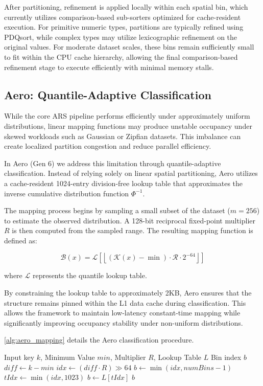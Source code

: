 After partitioning, refinement is applied locally within each spatial bin, which currently utilizes comparison-based sub-sorters optimized for cache-resident execution.
For primitive numeric types, partitions are typically refined using PDQsort, while complex types may utilize lexicographic refinement on the original values.
For moderate dataset scales, these bins remain sufficiently small to fit within the CPU cache hierarchy, allowing the final comparison-based refinement stage to execute efficiently with minimal memory stalls.

\subsection{Aero: Quantile-Adaptive Classification}
While the core ARS pipeline performs efficiently under approximately uniform distributions, linear mapping functions may produce unstable occupancy under skewed workloads such as Gaussian or Zipfian datasets.
This imbalance can create localized partition congestion and reduce parallel efficiency.

In Aero (Gen 6) we address this limitation through quantile-adaptive classification.
Instead of relying solely on linear spatial partitioning, Aero utilizes a cache-resident 1024-entry division-free lookup table that approximates the inverse cumulative distribution function $\Phi^{-1}$.

The mapping process begins by sampling a small subset of the dataset ($m = 256$) to estimate the observed distribution.
A 128-bit reciprocal fixed-point multiplier $R$ is then computed from the sampled range.
The resulting mapping function is defined as:

\begin{equation}
\mathcal{B}(x) =
\mathcal{L}
\left[
\left\lfloor
  (\mathcal{K}(x) - \min) \cdot \mathcal{R} \cdot 2^{-64}
\right\rfloor
\right]
\end{equation}

where $\mathcal{L}$ represents the quantile lookup table.

By constraining the lookup table to approximately 2KB, Aero ensures that the structure remains pinned within the L1 data cache during classification.
This allows the framework to maintain low-latency constant-time mapping while significantly improving occupancy stability under non-uniform distributions.

\cref{alg:aero_mapping} details the Aero classification procedure.

\begin{algorithm}
\caption{Aero Division-Free Quantile Mapping}
\label{alg:aero_mapping}
\begin{algorithmic}[1]
\REQUIRE Input key $k$, Minimum Value $min$, Multiplier $R$, Lookup Table $L$
\ENSURE Bin index $b$
\STATE $diff \gets k - min$
\STATE $idx \gets (diff \cdot R) \gg 64$
    \STATE $b \gets \min(idx, numBins - 1)$
\ELSE
    \STATE $tIdx \gets \min(idx, 1023)$
    \STATE $b \gets L[tIdx]$
\ENDIF
\RETURN $b$
\end{algorithmic}
\end{algorithm}


